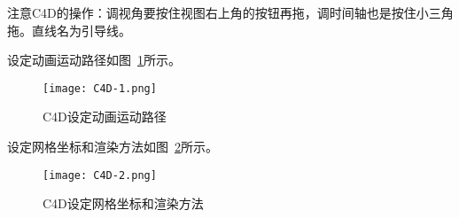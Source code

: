 注意C4D的操作：调视角要按住视图右上角的按钮再拖，调时间轴也是按住小三角拖。直线名为引导线。

设定动画运动路径如图~\ref{fig:C4D-1}所示。

\begin{figure}[htbp]
    \centering
    \texttt{[image: C4D-1.png]}
    \caption{C4D设定动画运动路径}
    \label{fig:C4D-1}
\end{figure}

设定网格坐标和渲染方法如图~\ref{fig:C4D-2}所示。

\begin{figure}[htbp]
    \centering
    \texttt{[image: C4D-2.png]}
    \caption{C4D设定网格坐标和渲染方法}
    \label{fig:C4D-2}
\end{figure}